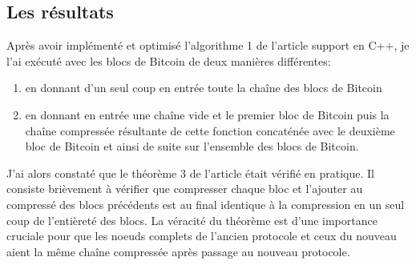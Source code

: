 \documentclass[12pt,a4paper]{article}
\begin{document}
	
	
	\subsection{Les résultats}
	
	Après avoir implémenté et optimisé l'algorithme 1 de l'article support en C++, je l'ai exécuté avec les blocs de Bitcoin de deux manières différentes:\\
	\begin{enumerate}
		\item en donnant d'un seul coup en entrée toute la chaîne des blocs de Bitcoin\\
	  \item en donnant en entrée une chaîne vide et le premier bloc de Bitcoin puis la chaîne compressée résultante de cette fonction concaténée avec le deuxième bloc de Bitcoin et ainsi de suite sur l'ensemble des blocs de Bitcoin.\\
	\end{enumerate}
	
	J'ai alors constaté que le théorème 3 de l'article était vérifié en pratique. Il consiste brièvement à vérifier que compresser chaque bloc et l'ajouter au compressé des blocs précédents est au final identique à la compression en un seul coup de l'entièreté des blocs. La véracité du théorème est d'une importance cruciale pour que les noeuds complets de l'ancien protocole et ceux du nouveau aient la même chaîne compressée après passage au nouveau protocole.\\
	
\end{document}
